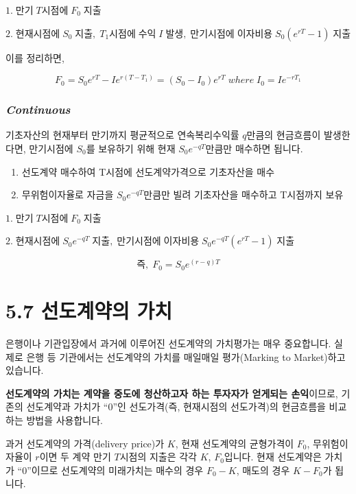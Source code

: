 \documentclass[
  letterpaper,
  DIV=11,
  numbers=noendperiod]{scrreprt}
\providecommand{\tightlist}{%
  \setlength{\itemsep}{0pt}\setlength{\parskip}{0pt}}\usepackage{longtable,booktabs,array}
\begin{document}
\(1.\;만기\;T시점에\;F_0\;지출\)

\(2.\;현재시점에\;S_0\;지출,\;T_1시점에\;수익\;I\;발생,\;만기시점에\;이자비용\;S_0(e^{rT}-1)\;지출\)

이를 정리하면,

\[F_0=S_0e^{rT}-Ie^{r(T-T_1)}=(S_0-I_0)e^{rT}\;where\;I_0=Ie^{-rT_1}\]

\subsubsection*{\texorpdfstring{\textbf{\emph{Continuous}}}{Continuous}}\label{sec-5.6con}

기초자산의 현재부터 만기까지 평균적으로 연속복리수익률 \(q\)만큼의
현금흐름이 발생한다면, 만기시점에 \(S_0\)를 보유하기 위해 현재
\(S_0e^{-qT}\)만큼만 매수하면 됩니다.

\begin{enumerate}
\def\labelenumi{\arabic{enumi}.}
\tightlist
\item
  선도계약 매수하여 T시점에 선도계약가격으로 기초자산을 매수
\item
  무위험이자율로 자금을 \(S_0e^{-qT}\)만큼만 빌려 기초자산을 매수하고
  T시점까지 보유
\end{enumerate}

\(1.\;만기\;T시점에\;F_0\;지출\)

\(2.\;현재시점에\;S_0e^{-qT}\;지출,\;만기시점에\;이자비용\;S_0e^{-qT}(e^{rT}-1)\;지출\)

\[즉,\;F_0=S_0e^{(r-q)T}\]

\section*{5.7 선도계약의
가치}\label{uxc120uxb3c4uxacc4uxc57duxc758-uxac00uxce58}


은행이나 기관입장에서 과거에 이루어진 선도계약의 가치평가는 매우
중요합니다. 실제로 은행 등 기관에서는 선도계약의 가치를 매일매일
평가(Marking to Market)하고 있습니다.

\textbf{선도계약의 가치는 계약을 중도에 청산하고자 하는 투자자가
얻게되는 손익}이므로, 기존의 선도계약과 가치가 ``0''인 선도가격(즉,
현재시점의 선도가격)의 현금흐름을 비교하는 방법을 사용합니다.

과거 선도계약의 가격(delivery price)가 \(K\), 현재 선도계약의 균형가격이
\(F_0\), 무위험이자율이 \(r\)이면 두 계약 만기 \(T\)시점의 지출은 각각
\(K\), \(F_0\)입니다. 현재 선도계약은 가치가 ``0''이므로 선도계약의
미래가치는 매수의 경우 \(F_0-K\), 매도의 경우 \(K-F_0\)가 됩니다.
\end{document}
